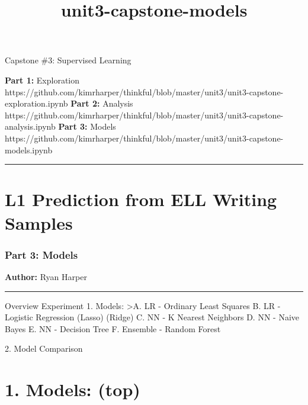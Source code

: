 \documentclass[11pt]{article}
\title{unit3-capstone-models}
\begin{document}
    
    
    \maketitle
    
    

    
    Capstone \#3: {Supervised Learning}

    

    \textbf{Part 1:} Exploration
https://github.com/kimrharper/thinkful/blob/master/unit3/unit3-capstone-exploration.ipynb
{\textbf{Part 2:} Analysis
https://github.com/kimrharper/thinkful/blob/master/unit3/unit3-capstone-analysis.ipynb
}{\textbf{Part 3:} Models
https://github.com/kimrharper/thinkful/blob/master/unit3/unit3-capstone-models.ipynb
}

    \begin{center}\rule{0.5\linewidth}{\linethickness}\end{center}

    \section{\texorpdfstring{{L1 Prediction from ELL Writing
Samples}}{L1 Prediction from ELL Writing Samples}}\label{l1-prediction-from-ell-writing-samples}

    \subsubsection{\texorpdfstring{{Part 3:
}{Models}}{Part 3: Models}}\label{part-3-models}

    \textbf{Author:} Ryan Harper

    \begin{center}\rule{0.5\linewidth}{\linethickness}\end{center}

    Overview Experiment 1. Models: \textgreater{}A. LR - Ordinary Least
Squares B. LR - Logistic Regression (Lasso) (Ridge) C. NN - K Nearest
Neighbors D. NN - Naive Bayes E. NN - Decision Tree F. Ensemble - Random
Forest

2. Model Comparison

    

    \section{\texorpdfstring{{1. Models:}
(top)}{1. Models: (top)}}\label{models-top}
\end{document}
